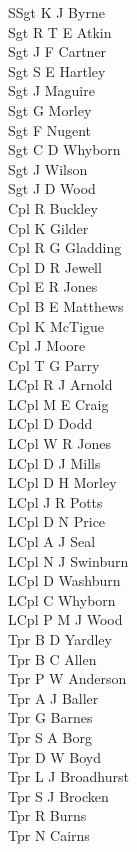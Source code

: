 \begin{multicols}{4}
  \scriptsize
  \noindent
  SSgt K J Byrne \\
  Sgt R T E Atkin \\
  Sgt J F Cartner \\
  Sgt S E Hartley \\
  Sgt J Maguire \\
  Sgt G Morley \\
  Sgt F Nugent \\
  Sgt C D Whyborn \\
  Sgt J Wilson \\
  Sgt J D Wood \\
  Cpl R Buckley \\
  Cpl K Gilder \\
  Cpl R G Gladding \\
  Cpl D R Jewell \\
  Cpl E R Jones \\
  Cpl B E Matthews \\
  Cpl K McTigue \\
  Cpl J Moore \\
  Cpl T G Parry \\
  LCpl R J Arnold \\
  LCpl M E Craig \\
  LCpl D Dodd \\
  LCpl W R Jones \\
  LCpl D J Mills \\
  LCpl D H Morley \\
  LCpl J R Potts \\
  LCpl D N Price \\
  LCpl A J Seal \\
  LCpl N J Swinburn \\
  LCpl D Washburn \\
  LCpl C Whyborn \\
  LCpl P M J Wood \\
  Tpr B D Yardley \\
  Tpr B C Allen \\
  Tpr P W Anderson \\
  Tpr A J Baller \\
  Tpr G Barnes \\
  Tpr S A Borg \\
  Tpr D W Boyd \\
  Tpr L J Broadhurst \\
  Tpr S J Brocken \\
  Tpr R Burns \\
  Tpr N Cairns \\

\end{multicols}
